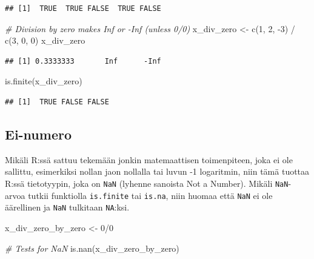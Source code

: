 \documentclass[
]{book}
\newenvironment{Shaded}{\begin{snugshade}}{\end{snugshade}}
\newcommand{\CommentTok}[1]{\textcolor[rgb]{0.56,0.35,0.01}{\textit{#1}}}
\newcommand{\DecValTok}[1]{\textcolor[rgb]{0.00,0.00,0.81}{#1}}
\newcommand{\FunctionTok}[1]{\textcolor[rgb]{0.00,0.00,0.00}{#1}}
\newcommand{\NormalTok}[1]{#1}
\newcommand{\OtherTok}[1]{\textcolor[rgb]{0.56,0.35,0.01}{#1}}
\newcommand{\SpecialCharTok}[1]{\textcolor[rgb]{0.00,0.00,0.00}{#1}}
\begin{document}
\begin{verbatim}
## [1]  TRUE  TRUE FALSE  TRUE FALSE
\end{verbatim}

\begin{Shaded}
\begin{Highlighting}[]
\CommentTok{\# Division by zero makes Inf or {-}Inf (unless 0/0)}
\NormalTok{x\_div\_zero }\OtherTok{\textless{}{-}} \FunctionTok{c}\NormalTok{(}\DecValTok{1}\NormalTok{, }\DecValTok{2}\NormalTok{, }\SpecialCharTok{{-}}\DecValTok{3}\NormalTok{) }\SpecialCharTok{/} \FunctionTok{c}\NormalTok{(}\DecValTok{3}\NormalTok{, }\DecValTok{0}\NormalTok{, }\DecValTok{0}\NormalTok{)}
\NormalTok{x\_div\_zero}
\end{Highlighting}
\end{Shaded}

\begin{verbatim}
## [1] 0.3333333       Inf      -Inf
\end{verbatim}

\begin{Shaded}
\begin{Highlighting}[]
\FunctionTok{is.finite}\NormalTok{(x\_div\_zero)}
\end{Highlighting}
\end{Shaded}

\begin{verbatim}
## [1]  TRUE FALSE FALSE
\end{verbatim}

\hypertarget{ei-numero}{%
\subsection{Ei-numero}\label{ei-numero}}

Mikäli R:ssä sattuu tekemään jonkin matemaattisen toimenpiteen, joka ei ole sallittu, esimerkiksi nollan jaon nollalla tai luvun -1 logaritmin, niin tämä tuottaa R:ssä tietotyypin, joka on \texttt{NaN} (lyhenne sanoista Not a Number). Mikäli \texttt{NaN}-arvoa tutkii funktiolla \texttt{is.finite} tai \texttt{is.na}, niin huomaa että \texttt{NaN} ei ole äärellinen ja \texttt{NaN} tulkitaan \texttt{NA}:ksi.

\begin{Shaded}
\begin{Highlighting}[]
\NormalTok{x\_div\_zero\_by\_zero }\OtherTok{\textless{}{-}} \DecValTok{0}\SpecialCharTok{/}\DecValTok{0}

\CommentTok{\# Tests for NaN}
\FunctionTok{is.nan}\NormalTok{(x\_div\_zero\_by\_zero)}
\end{Highlighting}
\end{Shaded}
\end{document}
